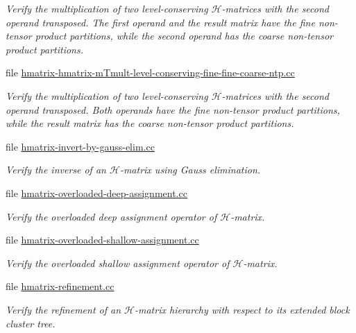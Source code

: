\begin{DoxyCompactItemize}
\begin{DoxyCompactList}\small\item\em Verify the multiplication of two level-\/conserving $\mathcal{H}$-\/matrices with the second operand transposed. The first operand and the result matrix have the fine non-\/tensor product partitions, while the second operand has the coarse non-\/tensor product partitions. \end{DoxyCompactList}\item 
file \hyperlink{hmatrix-hmatrix-mTmult-level-conserving-fine-fine-coarse-ntp_8cc}{hmatrix-\/hmatrix-\/m\+Tmult-\/level-\/conserving-\/fine-\/fine-\/coarse-\/ntp.\+cc}
\begin{DoxyCompactList}\small\item\em Verify the multiplication of two level-\/conserving $\mathcal{H}$-\/matrices with the second operand transposed. Both operands have the fine non-\/tensor product partitions, while the result matrix has the coarse non-\/tensor product partitions. \end{DoxyCompactList}\item 
file \hyperlink{hmatrix-invert-by-gauss-elim_8cc}{hmatrix-\/invert-\/by-\/gauss-\/elim.\+cc}
\begin{DoxyCompactList}\small\item\em Verify the inverse of an $\mathcal{H}$-\/matrix using Gauss elimination. \end{DoxyCompactList}\item 
file \hyperlink{hmatrix-overloaded-deep-assignment_8cc}{hmatrix-\/overloaded-\/deep-\/assignment.\+cc}
\begin{DoxyCompactList}\small\item\em Verify the overloaded deep assignment operator of $\mathcal{H}$-\/matrix. \end{DoxyCompactList}\item 
file \hyperlink{hmatrix-overloaded-shallow-assignment_8cc}{hmatrix-\/overloaded-\/shallow-\/assignment.\+cc}
\begin{DoxyCompactList}\small\item\em Verify the overloaded shallow assignment operator of $\mathcal{H}$-\/matrix. \end{DoxyCompactList}\item 
file \hyperlink{hmatrix-refinement_8cc}{hmatrix-\/refinement.\+cc}
\begin{DoxyCompactList}\small\item\em Verify the refinement of an $\mathcal{H}$-\/matrix hierarchy with respect to its extended block cluster tree. \end{DoxyCompactList}\item 

\end{DoxyCompactItemize}
